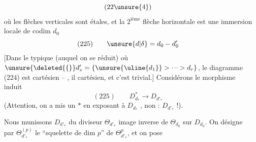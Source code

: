\[
(22\unsure{4})
\]
où les flèches verticales sont étales,
et la $2^{\mathrm{ième}}$ flèche horizontale est une
immersion locale de codim $d_0$ 
\[
(225)\qquad \unsure{d|\delta}=d_0-d'_0
\]
[Dans le typique (auquel on se réduit)
où $\unsure{\deleted{\{}}d'_* = \{\unsure{\uline{d_1}}>\cdot\,\text{--}>d_r\}$, le diagramme
(224) est cartésien -- , il
  cartésien,  et c'est trivial.]
Considérons le morphisme induit
\[
(225)\qquad D^*_{d_*}\longrightarrow D_{d'_*}
\]
(Attention, on a mis un $*$ en exposant
à $D_{d_*}$ , non : $D_{d'_*}$ !).

Nous munissons $D_{d'_*}$ du diviseur
$\Theta_{d'_*}$ image inverse de $\Theta_{d_0}$ sur $D_{d_0}$.
On désigne par $\Theta_{d'_*}^{(p)}$ le ``squelette
de dim $p$'' de $\Theta_{d'_*}^{p}$, et  on pose
